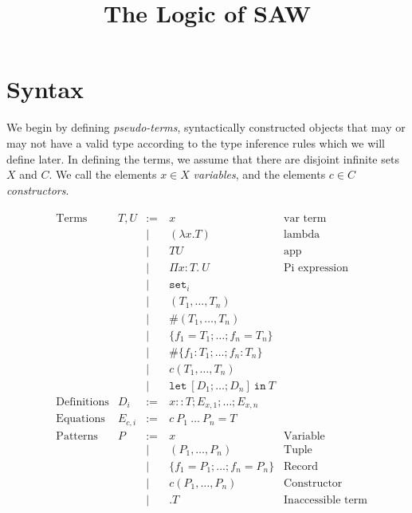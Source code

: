 \documentclass{article}
\title{The Logic of SAW}
\newcommand{\fn}[1]{\mathtt{#1}}
\newcommand{\set}[1]{\fn{set}_{#1}}
\newcommand{\Piexpr}[3]{\Pi {#1}{:}{#2}.\ {#3}}
\begin{document}

\section{Syntax}

We begin by defining \emph{pseudo-terms}, syntactically constructed objects that
may or may not have a valid type according to the type inference rules which we
will define later.  In defining the terms, we assume that there are disjoint infinite
sets $X$ and $C$.  We call the elements $x \in X$ \emph{variables}, and the elements
$c \in C$ \emph{constructors}.

\begin{align*}
&\begin{array}{llrll}
\text{Terms}
& T,U    &:=\:& x & \text{var term}\\
&        & |\:& (\lambda x . T) &\text{lambda}\\
&        & |\:& T U &\text{app}\\
&        & |\:& \Piexpr{x}{T}{U} &\text{Pi expression}\\
&        & |\:& \set{i}\\
&        & |\:& (T_1, \dots, T_n)\\ %
&        & |\:& \#(T_1, \dots, T_n)\\ %
&        & |\:& \{ f_1 = T_1; \dots; f_n = T_n \} \\ %
&        & |\:& \#\{ f_1 : T_1; \dots; f_n : T_n \} \\ %
&        & |\:& c(T_1,\dots,T_n)\\ %
&        & |\:& \fn{let}\ [ D_1; \dots; D_n ]\ \fn{in}\ T\\ %
\text{Definitions}
&D_i     &:=\:&x :: T; E_{x,1}; \dots; E_{x,n}\\
\text{Equations}
&E_{c,i} &:=\:&c\ P_1\ \dots\ P_n = T\\
\text{Patterns}
&P       &:=\:&x & \text{Variable}\\
&        & |\:&(P_1, \dots, P_n) &\text{Tuple}\\ %
&        & |\:&\{ f_1 = P_1; \dots; f_n = P_n \} & \text{Record}\\ %
&        & |\:&c(P_1, \dots, P_n) & \text{Constructor}\\ %
&        & |\:&.T & \text{Inaccessible term}\\
\end{array}\\
\end{align*}
\end{document}
